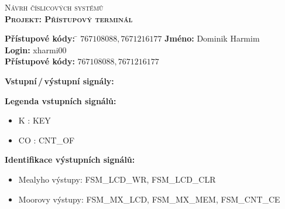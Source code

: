 \documentclass[a4paper, 12pt]{article}
\begin{document}
	\begin{titlepage}
		\setlength{\parindent}{0pt}

		\begin{center}
			\Large
			\textsc{
				Návrh číslicových systémů \\
				\textbf{Projekt: Přístupový terminál}
			}
		\end{center}

		\begin{tabbing}
			\large
			\textbf{Přístupové kódy:} \quad \= $ 767108088, 7671216177 $ \kill
			\textbf{Jméno:} \> Dominik Harmim \\
			\textbf{Login:} \> xharmi00 \\
			\textbf{Přístupové kódy:} \> $ 767108088, 7671216177 $
		\end{tabbing}

		{\large\textbf{Vstupní\,/\,výstupní signály:}}
		\begin{multicols}{2}
			\textbf{Legenda vstupních signálů:}
			\begin{itemize}
				\item K : KEY
				\item CO : CNT\_OF \\
			\end{itemize}

			\columnbreak

			\textbf{Identifikace výstupních signálů:}
			\begin{itemize}
				\item Mealyho výstupy: FSM\_LCD\_WR, FSM\_LCD\_CLR
				\item Moorovy výstupy: FSM\_MX\_LCD, FSM\_MX\_MEM, FSM\_CNT\_CE
			\end{itemize}
		\end{multicols}


\end{titlepage}
\end{document}
